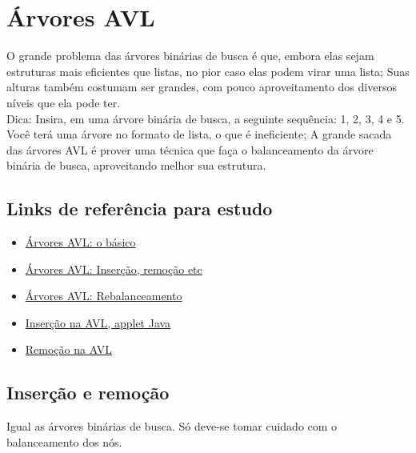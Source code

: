 \documentclass{article}
\begin{document}
\newpage

\section{Árvores AVL}
O grande problema das árvores binárias de busca é que, embora elas sejam
estruturas mais eficientes que listas, no pior caso elas podem virar uma lista;
Suas alturas também costumam ser grandes, com pouco aproveitamento dos diversos
níveis que ela pode ter.\\Dica: Insira, em uma árvore binária de busca, a
seguinte sequência: 1, 2, 3, 4 e 5. Você terá uma árvore no formato de lista, o
que é ineficiente; A grande sacada das árvores AVL é prover uma técnica que faça
o balanceamento da árvore binária de busca, aproveitando melhor sua estrutura.

\subsection{Links de referência para estudo}
\begin{itemize}
	\item \href{http://equipe.nce.ufrj.br/adriano/c/apostila/arvore.htm}{Árvores AVL: o básico}
	\item \href{http://www.dei.isep.ipp.pt/~hleitao/EI/ARVORESAVL.pdf}{Árvores AVL: Inserção, remoção etc}
	\item \href{http://www.icmc.usp.br/~sce182/arvbinrb.html}{Árvores AVL: Rebalanceamento}
	\item \href{http://www.site.uottawa.ca/~stan/csi2514/applets/avl/BT.html}{Inserção na AVL, applet Java}
	\item \href{http://www.lcad.icmc.usp.br/~nonato/ED/AVL/remocao.html}{Remoção na AVL}
\end{itemize}

\subsection{Inserção e remoção}

Igual as árvores binárias de busca. Só deve-se tomar cuidado com o balanceamento dos nós.
\end{document}
